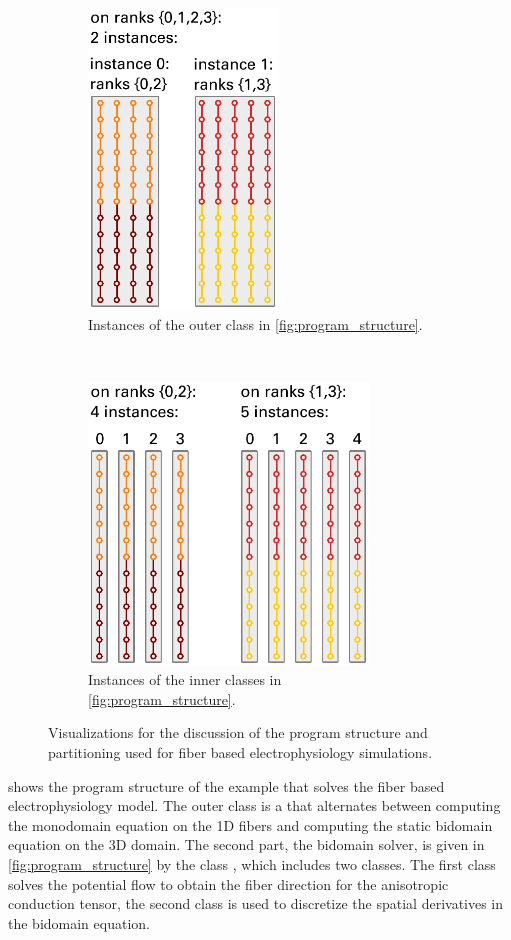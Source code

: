 \begin{figure}
\begin{subfigure}[t]{0.48\textwidth}
    \includegraphics[height=8cm]{images/implementation/fiber_partitioning1.pdf}
    \caption{Instances of the outer  class in \cref{fig:program_structure}.}%
    \label{fig:fiber_partitioning1}%
  \end{subfigure}
  \,
  \begin{subfigure}[t]{0.48\textwidth}%
    \centering%
    \includegraphics[height=7.5cm]{images/implementation/fiber_partitioning2.pdf}
    \caption{Instances of the inner \break{} classes in \cref{fig:program_structure}.}%
    \label{fig:fiber_partitioning2}%
  \end{subfigure}
  \caption{Visualizations for the discussion of the program structure and partitioning used for fiber based electrophysiology simulations.}%
  \label{fig:partitioning_program}%
\end{figure}%

 shows the program structure of the example that solves the fiber based electrophysiology model. The outer class is a  that alternates between computing the monodomain equation on the 1D fibers and computing the static bidomain equation on the 3D domain. The second part, the bidomain solver, is given in \cref{fig:program_structure} by the class , which includes two  classes. The first class solves the potential flow to obtain the fiber direction for the anisotropic conduction tensor, the second class is used to discretize the spatial derivatives in the bidomain equation.

